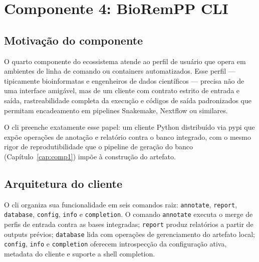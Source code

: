 \chapter{Componente 4: BioRemPP CLI}
\label{cap:comp4}

\section{Motivação do componente}
\label{sec:c4-motivacao}

O quarto componente do ecossistema \biorempp{} atende ao perfil de usuário que opera em ambientes de linha de comando ou containers automatizados. Esse perfil --- tipicamente bioinformatas e engenheiros de dados científicos --- precisa não de uma interface amigável, mas de um cliente com contrato estrito de entrada e saída, rastreabilidade completa da execução e códigos de saída padronizados que permitam encadeamento em pipelines Snakemake, Nextflow ou similares.

O \gls{cli} preenche exatamente esse papel: um cliente Python distribuído via \gls{pypi} que expõe operações de anotação e relatório contra o banco integrado, com o mesmo rigor de reprodutibilidade que o pipeline de geração do banco (Capítulo~\ref{cap:comp1}) impõe à construção do artefato.

\section{Arquitetura do cliente}
\label{sec:c4-arquitetura}

O \gls{cli} organiza sua funcionalidade em seis comandos raiz: \texttt{annotate}, \texttt{report}, \texttt{database}, \texttt{config}, \texttt{info} e \texttt{completion}. O comando \texttt{annotate} executa o merge de perfis de entrada contra as bases integradas; \texttt{report} produz relatórios a partir de outputs prévios; \texttt{database} lida com operações de gerenciamento do artefato local; \texttt{config}, \texttt{info} e \texttt{completion} oferecem introspecção da configuração ativa, metadata do cliente e suporte a shell completion.

